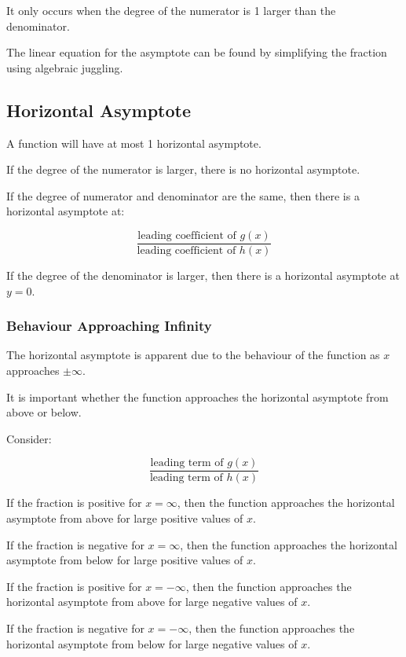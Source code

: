 \documentclass[a4paper,11pt]{article}
\begin{document}
It only occurs when the degree of the numerator is 1 larger than the denominator.

The linear equation for the asymptote can be found by simplifying the fraction
using algebraic juggling.


\subsection{Horizontal Asymptote}

A function will have at most 1 horizontal asymptote.

If the degree of the numerator is larger, there is no horizontal asymptote.

If the degree of numerator and denominator are the same, then there is a
horizontal asymptote at:

$$
\frac{\text{leading coefficient of $g(x)$}}{\text{leading coefficient of $h(x)$}}
$$

If the degree of the denominator is larger, then there is a horizontal
asymptote at $y = 0$.


\subsubsection{Behaviour Approaching Infinity}

The horizontal asymptote is apparent due to the behaviour of the function as
$x$ approaches $\pm \infty$.

It is important whether the function approaches the horizontal asymptote from
above or below.

Consider:

$$
\frac{\text{leading term of $g(x)$}}{\text{leading term of $h(x)$}}
$$

If the fraction is positive for $x = \infty$, then the function approaches the
horizontal asymptote from above for large positive values of $x$.

If the fraction is negative for $x = \infty$, then the function approaches the
horizontal asymptote from below for large positive values of $x$.

If the fraction is positive for $x = -\infty$, then the function approaches the
horizontal asymptote from above for large negative values of $x$.

If the fraction is negative for $x = -\infty$, then the function approaches the
horizontal asymptote from below for large negative values of $x$.
\end{document}
